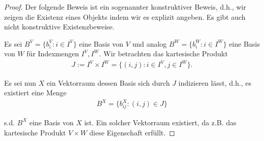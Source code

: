 \begin{proof}
 Der folgende Beweis ist ein sogenannter konstruktiver Beweis, d.h., wir zeigen die Existenz eines Objekts indem wir es explizit angeben. Es gibt auch nicht konstruktive Existenzbeweise.

\par
Es sei \(B^V = \{b_i^V: i\in I^V\}\) eine Basis von \(V\) und analog \(B^W = \{b_i^W: i\in I^W\}\)  eine Basis von \(W\) für Indexmengen \(I^V, I^W\). Wir betrachten das kartesische Produkt
\begin{align*}
J := I^V \times I^W = \{(i,j): i\in I^V, j\in I^W\}.
\end{align*}
\par
Es sei nun \(X\) ein Vektorraum dessen Basis sich durch \(J\) indizieren lässt, d.h., es existiert eine Menge
\begin{align*}
B^X = \{b_{ij}^X: (i,j)\in J\}
\end{align*}
\par
s.d. \(B^X\) eine Basis von \(X\) ist. Ein solcher Vektorraum existiert, da z.B. das kartesische Produkt \(V\times W\) diese Eigenschaft erfüllt.


\end{proof}
